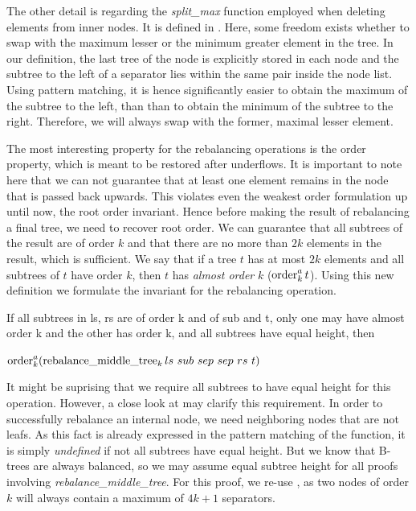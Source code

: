 The other detail is regarding the \textit{split\_max} function
employed when deleting elements from inner nodes.
It is defined in .
Here, some freedom exists whether to swap with the maximum lesser
or the minimum greater element in the tree.
In our definition, the last tree of the node is explicitly stored in each node
and the subtree to the left of a separator lies within the same
pair inside the node list.
Using pattern matching, it is hence significantly
easier to obtain the maximum of the subtree to the left,
than than to obtain the minimum of the subtree to the right.
Therefore, we will always swap with the former, maximal lesser element.

The most interesting property for the rebalancing operations is the order property,
which is meant to be restored after underflows.
It is important to note here that we can not guarantee
that at least one element remains in the node that
is passed back upwards.
This violates even the weakest order formulation up until now,
the root order invariant.
Hence before making the result of rebalancing
a final tree, we need to recover root order.
We can guarantee that all subtrees of the result are of order $k$
and that there are no more than $2k$ elements in the result,
which is sufficient.
We say that if a tree $t$ has at most $2k$ elements
and all subtrees of $t$ have order $k$, then $t$ has
\textit{almost order} $k$ ($\operatorname{order}^a_k t$).
Using this new definition we formulate the invariant for
the rebalancing operation.

\begin{lemma}
    If all subtrees in ls, rs are of order k 
    and of sub and t, only one may have almost order k and the other has order k,
    and all subtrees have equal height, then \\
    \begin{center}
    $\order^a_k (\rebalancemt_k ls\ sub\ sep\ sep\ rs\ t)$
    \end{center}
\end{lemma}

It might be suprising that we require all subtrees to have equal height
for this operation.
However, a close look at  may clarify this requirement.
In order to successfully rebalance an internal node, we need neighboring
nodes that are not leafs.
As this fact is already expressed in the pattern matching of the function,
it is simply \textit{undefined} if not all subtrees have equal height.
But we know that B-trees are always balanced,
so we may assume equal subtree height for all proofs
involving \textit{rebalance\_middle\_tree}.
For this proof, we re-use ,
as two nodes of order $k$ will always contain
a maximum of $4k+1$ separators.

